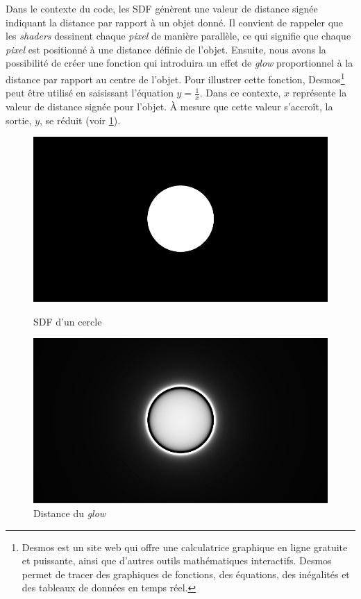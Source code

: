 Dans le contexte du code, les SDF génèrent une valeur de distance signée indiquant la distance par rapport à un objet donné. Il convient de rappeler que les \textit{shaders} dessinent chaque \textit{pixel} de manière parallèle, ce qui signifie que chaque \textit{pixel} est positionné à une distance définie de l'objet.
Ensuite, nous avons la possibilité de créer une fonction qui introduira un effet de \textit{glow} proportionnel à la distance par rapport au centre de l'objet. Pour illustrer cette fonction, Desmos\footnote{Desmos est un site web qui offre une calculatrice graphique en ligne gratuite et puissante, ainsi que d'autres outils mathématiques interactifs. Desmos permet de tracer des graphiques de fonctions, des équations, des inégalités et des tableaux de données en temps réel.} peut être utilisé en saisissant l'équation $y = \frac{1}{x}$. Dans ce contexte, $x$ représente la valeur de distance signée pour l'objet. À mesure que cette valeur s'accroît, la sortie, $y$, se réduit (voir \ref{glow2}).

\begin{figure}[h]
  \begin{minipage}[b]{0.45\linewidth}
    \centering
    \includegraphics[width=\linewidth]{images/shaders/glow1.png}
    \caption{SDF d'un cercle}
    \label{glow1}
  \end{minipage}
  \hspace{0.1\linewidth} %
  \begin{minipage}[b]{0.45\linewidth}
    \centering
    \includegraphics[width=\linewidth]{images/shaders/glow2.png}
    \caption{Distance du \textit{glow}}
    \label{glow2}
  \end{minipage}
\end{figure}


